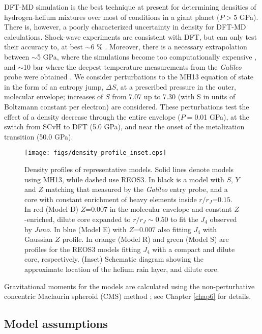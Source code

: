 DFT-MD simulation is the best technique at present for determining
densities of hydrogen-helium mixtures over most of conditions in a giant planet
($P>5$ GPa).  There is, however, a poorly characterized uncertainty in density
for DFT-MD calculations. Shock-wave experiments are consistent with DFT, but
can only test their accuracy to, at best $\sim$6 \%
\citep{Knudson2004,Brygoo2015}.  Moreover, there is a necessary extrapolation
between $\sim$5 GPa, where the simulations become too computationally expensive
\citep{militzer2013a,militzer2013b}, and $\sim$10 bar where the deepest
temperature measurements from the \textit{Galileo} probe were obtained
\citep{Seiff1997}.  We consider perturbations to the MH13 equation of state in
the form of an entropy jump, $\Delta S$, at a prescribed pressure in the outer,
molecular envelope; increases of $S$ from 7.07 up to 7.30 (with S in units of
Boltzmann constant per electron) are considered. These perturbations test the
effect of a density decrease through the entire envelope ($P=$0.01 GPa), at the
switch from SCvH to DFT (5.0 GPa), and near the onset of the metalization
transition (50.0 GPa). 


\begin{figure}[h]
\centering

\texttt{[image: figs/density\_profile\_inset.eps]}

\caption{Density profiles of representative models. Solid lines denote models
    using MH13, while dashed use REOS3. In black is a model with $S$, $Y$ and $Z$
    matching that measured by the \textit{Galileo} entry probe, and a core with constant
    enrichment of heavy elements inside $r/r_J$=$0.15$.  In red (Model
    D) $Z$=$0.007$ in the molecular envelope and constant $Z$-enriched, dilute
    core expanded to $r/r_J\sim0.50$ to fit the $J_4$ observed by
    \textit{Juno}. In blue (Model E) with $Z$=$0.007$ also fitting $J_4$ with
    Gaussian $Z$ profile. In orange (Model R) and green (Model S) are profiles
    for the REOS3 models fitting $J_4$ with a compact and dilute core,
    respectively. (Inset) Schematic diagram showing the approximate location of
the helium rain layer, and dilute core.}
\label{fig:density}
\end{figure}

Gravitational moments for the models are calculated using the non-perturbative
concentric Maclaurin spheroid (CMS) method
\citep{hubbard2012,hubbard2013,hubbard2016,wahl2016}; see Chapter \ref{chap6} for details. 

\subsection{Model assumptions}\label{sec:model}

